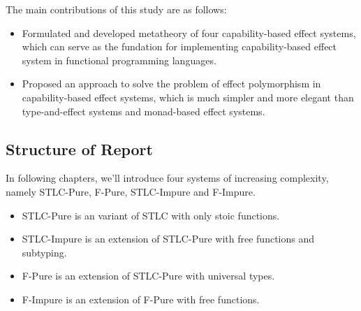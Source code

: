 The main contributions of this study are as follows:

\begin{itemize}
\item Formulated and developed metatheory of four capability-based
  effect systems, which can serve as the fundation for implementing
  capability-based effect system in functional programming languages.
\item Proposed an approach to solve the problem of effect polymorphism
  in capability-based effect systems, which is much simpler and more
  elegant than type-and-effect systems and monad-based effect systems.
\end{itemize}

\subsection{Structure of Report}

In following chapters, we'll introduce four systems of increasing
complexity, namely STLC-Pure, F-Pure, STLC-Impure and F-Impure.

\begin{itemize}
\item STLC-Pure is an variant of STLC with only stoic functions.
\item STLC-Impure is an extension of STLC-Pure with free functions and subtyping.
\item F-Pure is an extension of STLC-Pure with universal types.
\item F-Impure is an extension of F-Pure with free functions.
\end{itemize}
